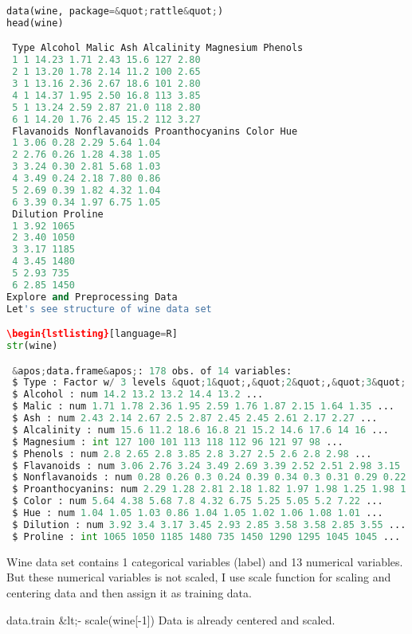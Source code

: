 \begin{lstlisting}[language=Python]
data(wine, package=&quot;rattle&quot;)
head(wine)

 Type Alcohol Malic Ash Alcalinity Magnesium Phenols
 1 1 14.23 1.71 2.43 15.6 127 2.80
 2 1 13.20 1.78 2.14 11.2 100 2.65
 3 1 13.16 2.36 2.67 18.6 101 2.80
 4 1 14.37 1.95 2.50 16.8 113 3.85
 5 1 13.24 2.59 2.87 21.0 118 2.80
 6 1 14.20 1.76 2.45 15.2 112 3.27
 Flavanoids Nonflavanoids Proanthocyanins Color Hue
 1 3.06 0.28 2.29 5.64 1.04
 2 2.76 0.26 1.28 4.38 1.05
 3 3.24 0.30 2.81 5.68 1.03
 4 3.49 0.24 2.18 7.80 0.86
 5 2.69 0.39 1.82 4.32 1.04
 6 3.39 0.34 1.97 6.75 1.05
 Dilution Proline
 1 3.92 1065
 2 3.40 1050
 3 3.17 1185
 4 3.45 1480
 5 2.93 735
 6 2.85 1450
Explore and Preprocessing Data
Let's see structure of wine data set

\begin{lstlisting}[language=R]
str(wine)

 &apos;data.frame&apos;: 178 obs. of 14 variables:
 $ Type : Factor w/ 3 levels &quot;1&quot;,&quot;2&quot;,&quot;3&quot;: 1 1 1 1 1 1 1 1 1 1 ...
 $ Alcohol : num 14.2 13.2 13.2 14.4 13.2 ...
 $ Malic : num 1.71 1.78 2.36 1.95 2.59 1.76 1.87 2.15 1.64 1.35 ...
 $ Ash : num 2.43 2.14 2.67 2.5 2.87 2.45 2.45 2.61 2.17 2.27 ...
 $ Alcalinity : num 15.6 11.2 18.6 16.8 21 15.2 14.6 17.6 14 16 ...
 $ Magnesium : int 127 100 101 113 118 112 96 121 97 98 ...
 $ Phenols : num 2.8 2.65 2.8 3.85 2.8 3.27 2.5 2.6 2.8 2.98 ...
 $ Flavanoids : num 3.06 2.76 3.24 3.49 2.69 3.39 2.52 2.51 2.98 3.15 ...
 $ Nonflavanoids : num 0.28 0.26 0.3 0.24 0.39 0.34 0.3 0.31 0.29 0.22 ...
 $ Proanthocyanins: num 2.29 1.28 2.81 2.18 1.82 1.97 1.98 1.25 1.98 1.85 ...
 $ Color : num 5.64 4.38 5.68 7.8 4.32 6.75 5.25 5.05 5.2 7.22 ...
 $ Hue : num 1.04 1.05 1.03 0.86 1.04 1.05 1.02 1.06 1.08 1.01 ...
 $ Dilution : num 3.92 3.4 3.17 3.45 2.93 2.85 3.58 3.58 2.85 3.55 ...
 $ Proline : int 1065 1050 1185 1480 735 1450 1290 1295 1045 1045 ...
\end{lstlisting}

Wine data set contains 1 categorical variables (label) and 13 numerical variables. But these numerical variables is not scaled, I use scale function for scaling and centering data and then assign it as training data.

data.train &lt;- scale(wine[-1])
Data is already centered and scaled.

